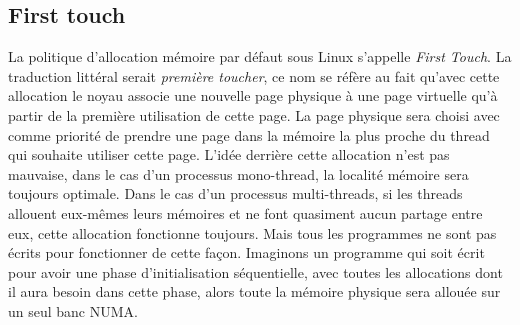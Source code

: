 \subsection{First touch}
La politique d'allocation mémoire par défaut sous Linux s'appelle {\em First Touch}.
%
La traduction littéral serait {\em première toucher}, ce nom se réfère au fait qu'avec cette allocation le noyau associe une nouvelle page physique à une page virtuelle qu'à partir de la première utilisation de cette page.
%
La page physique sera choisi avec comme priorité de prendre une page dans la mémoire la plus proche du thread qui souhaite utiliser cette page.
%
L'idée derrière cette allocation n'est pas mauvaise, dans le cas d'un processus mono-thread, la localité mémoire sera toujours optimale.
%
Dans le cas d'un processus multi-threads, si les threads allouent eux-mêmes leurs mémoires et ne font quasiment aucun partage entre eux, cette allocation fonctionne toujours.
%
Mais tous les programmes ne sont pas écrits pour fonctionner de cette façon.
%
Imaginons un programme qui soit écrit pour avoir une phase d'initialisation séquentielle, avec toutes les allocations dont il aura besoin dans cette phase, alors toute la mémoire physique sera allouée sur un seul banc NUMA.
